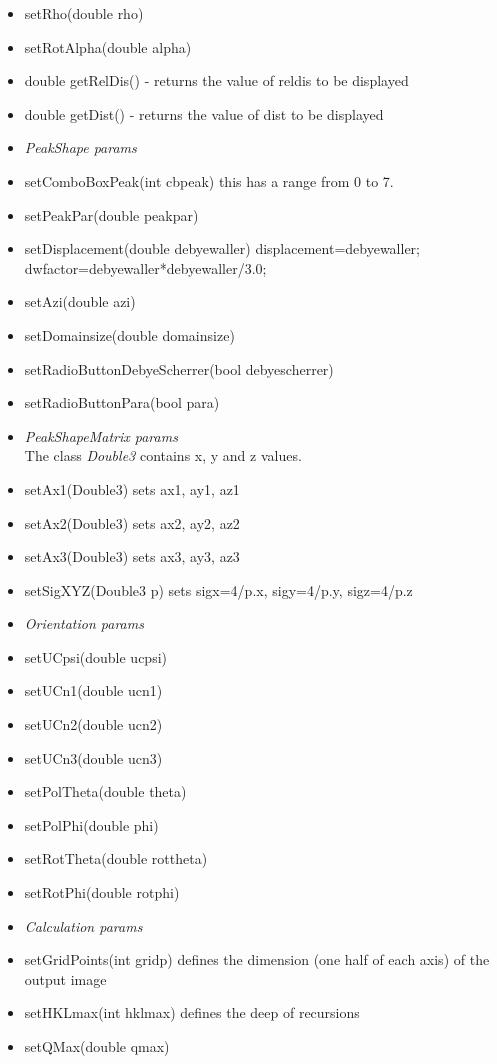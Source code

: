 \documentclass[11pt]{article} %
\begin{document}
\begin{itemize}
\item setRho(double rho)
\item setRotAlpha(double alpha)
\item double getRelDis() - returns the value of reldis to be displayed
\item double getDist() - returns the value of dist to be displayed
% 
\item[] {\it PeakShape params}
\item setComboBoxPeak(int cbpeak) this has a range from 0 to 7.
\item setPeakPar(double peakpar)
\item setDisplacement(double debyewaller) displacement=debyewaller; dwfactor=debyewaller*debyewaller/3.0;
\item setAzi(double azi)
\item setDomainsize(double domainsize)
\item setRadioButtonDebyeScherrer(bool debyescherrer)
\item setRadioButtonPara(bool para)
% 
\item[] {\it PeakShapeMatrix params} \\
	The class {\it Double3} contains x, y and z values.
\item setAx1(Double3) sets ax1, ay1, az1
\item setAx2(Double3) sets ax2, ay2, az2
\item setAx3(Double3) sets ax3, ay3, az3
\item setSigXYZ(Double3 p) sets sigx=4/p.x, sigy=4/p.y, sigz=4/p.z
% 
\item[] {\it Orientation params}
\item setUCpsi(double ucpsi)
\item setUCn1(double ucn1)
\item setUCn2(double ucn2)
\item setUCn3(double ucn3)
\item setPolTheta(double theta)
\item setPolPhi(double phi)
\item setRotTheta(double rottheta)
\item setRotPhi(double rotphi)
% 
\item[] {\it Calculation params}
\item setGridPoints(int gridp) defines the dimension (one half of each axis) of the output image
\item setHKLmax(int hklmax) defines the deep of recursions
\item setQMax(double qmax)

\end{itemize}
\end{document}
